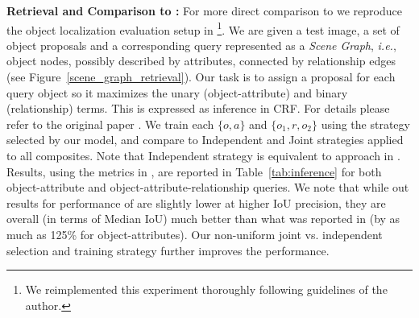 \documentclass[runningheads]{llncs}
\makeatletter
\newcommand{\RevComment} [1]{{\color{Red}{#1}}}
\newcommand*{\ie}{{\em i.e.}\@\xspace}
\makeatother
\begin{document}
\vspace{0.1in}
\noindent
{\bf Retrieval and Comparison to \cite{Johnson2015}:}
For more direct comparison to \cite{Johnson2015} we reproduce the object localization evaluation setup in \cite{Johnson2015}\footnote{We reimplemented this experiment thoroughly following guidelines of the author.}. We are given a test image, a set of object proposals and a corresponding query represented as a {\em Scene Graph}, \ie, object nodes, possibly described by attributes, connected by relationship edges (see Figure~\ref{scene_graph_retrieval}). Our task is to assign a proposal for each query object so it maximizes the unary (object-attribute) and binary (relationship) terms. This is expressed as inference in CRF. For details please refer to the original paper \cite{Johnson2015}. We train each $\{o,a\}$ and $\{o_1,r,o_2\}$ using the strategy selected by our model, and compare to Independent and Joint  strategies applied to all composites. Note that  Independent strategy is equivalent to approach in \cite{Johnson2015}. Results, using the metrics in \cite{Johnson2015}, are reported in Table~\ref{tab:inference} for both object-attribute and object-attribute-relationship queries.
We note that while out results for performance of \cite{Johnson2015} are slightly lower at higher IoU precision, they are overall (in terms of Median IoU) much better than what was reported in \cite{Johnson2015} (by as much as 125\% for object-attributes). Our non-uniform joint vs. independent selection and training strategy further improves the performance. 
\end{document}
